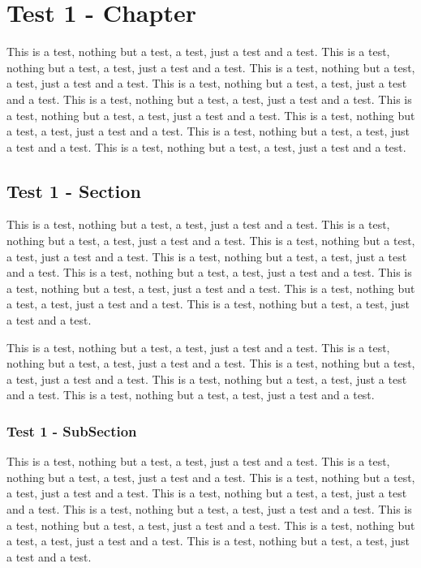 \chapter{Test 1 - Chapter}

This is a test, nothing but a test, a test, just a test and a test.
This is a test, nothing but a test, a test, just a test and a test.
This is a test, nothing but a test, a test, just a test and a test.
This is a test, nothing but a test, a test, just a test and a test.
This is a test, nothing but a test, a test, just a test and a test.
This is a test, nothing but a test, a test, just a test and a test.
This is a test, nothing but a test, a test, just a test and a test.
This is a test, nothing but a test, a test, just a test and a test.
This is a test, nothing but a test, a test, just a test and a test.

\section{Test 1 - Section}

This is a test, nothing but a test, a test, just a test and a test.
This is a test, nothing but a test, a test, just a test and a test.
This is a test, nothing but a test, a test, just a test and a test.
This is a test, nothing but a test, a test, just a test and a test.
This is a test, nothing but a test, a test, just a test and a test.
This is a test, nothing but a test, a test, just a test and a test.
This is a test, nothing but a test, a test, just a test and a test.
This is a test, nothing but a test, a test, just a test and a test.

This is a test, nothing but a test, a test, just a test and a test.
This is a test, nothing but a test, a test, just a test and a test.
This is a test, nothing but a test, a test, just a test and a test.
This is a test, nothing but a test, a test, just a test and a test.
This is a test, nothing but a test, a test, just a test and a test.

\subsection{Test 1 - SubSection}

This is a test, nothing but a test, a test, just a test and a test.
This is a test, nothing but a test, a test, just a test and a test.
This is a test, nothing but a test, a test, just a test and a test.
This is a test, nothing but a test, a test, just a test and a test.
This is a test, nothing but a test, a test, just a test and a test.
This is a test, nothing but a test, a test, just a test and a test.
This is a test, nothing but a test, a test, just a test and a test.
This is a test, nothing but a test, a test, just a test and a test.

